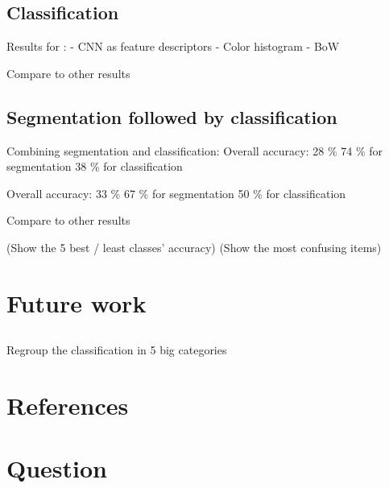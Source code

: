 \documentclass[aspectratio=169]{beamer}
\let\oldsection\section
\renewcommand{\section}[1]{
    \oldsection{#1}	
    \subsection{}
}
\newenvironment{myframe}[1][t]{\begin{frame}[#1]{\secname}{\subsecname}}{\end{frame}}
\begin{document}
    \subsection{Classification}
    
    \begin{myframe}
        Results for :
        - CNN as feature descriptors
        - Color histogram
        - BoW
        
        Compare to other results
    \end{myframe}
    
    \subsection{Segmentation followed by classification}
    
    \begin{myframe}
        Combining segmentation and classification:
        Overall accuracy: 28 \%
        74 \% for segmentation
        38 \% for classification
        
        Overall accuracy: 33 \%
        67 \% for segmentation
        50 \% for classification
        
        Compare to other results
        
        (Show the 5 best / least classes' accuracy)
        (Show the most confusing items)
    \end{myframe}
    
    \section{Future work}
    
    \begin{myframe}
        Regroup the classification in 5 big categories
    \end{myframe}
    
    \section{References}
    
    \begin{myframe}[t, allowframebreaks]
        \printbibliography[heading=none]
    \end{myframe}
    
    \section{Question}
    
\end{document}
